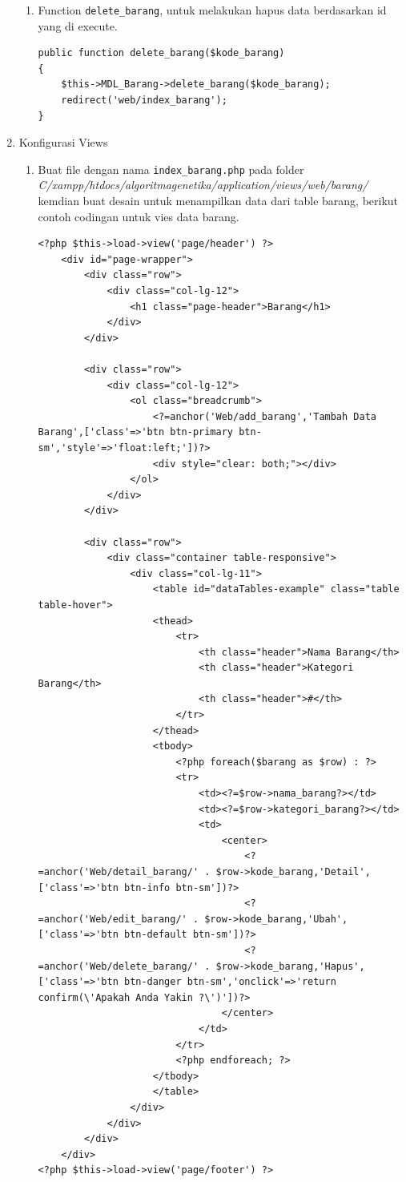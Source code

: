 \begin{enumerate}
\begin{enumerate}
    	\item Function \verb|delete_barang|, untuk melakukan hapus data berdasarkan id yang di execute.
\begin{lstlisting}
public function delete_barang($kode_barang)
{
	$this->MDL_Barang->delete_barang($kode_barang);
	redirect('web/index_barang');	
}
\end{lstlisting}
    \end{enumerate}
    
    \item Konfigurasi Views
    \begin{enumerate}
        \item Buat file dengan nama \verb|index_barang.php| pada folder \textit{C/xampp/htdocs/algoritmagenetika/application/views/web/barang/} kemdian buat desain untuk menampilkan data dari table barang, berikut contoh codingan untuk vies data barang.
\begin{lstlisting}
<?php $this->load->view('page/header') ?>
    <div id="page-wrapper">
        <div class="row">
            <div class="col-lg-12">
                <h1 class="page-header">Barang</h1>
            </div>
        </div>

        <div class="row">
            <div class="col-lg-12">
                <ol class="breadcrumb">
                    <?=anchor('Web/add_barang','Tambah Data Barang',['class'=>'btn btn-primary btn-sm','style'=>'float:left;'])?>
                    <div style="clear: both;"></div>
                </ol>
            </div>
        </div>

        <div class="row">
            <div class="container table-responsive">
                <div class="col-lg-11">
                    <table id="dataTables-example" class="table table-hover">
                    <thead>
                        <tr>
                            <th class="header">Nama Barang</th>
                            <th class="header">Kategori Barang</th>
                            <th class="header">#</th>
                        </tr>
                    </thead>
                    <tbody>
                        <?php foreach($barang as $row) : ?> 
                        <tr>
                            <td><?=$row->nama_barang?></td>
                            <td><?=$row->kategori_barang?></td>
                            <td>
                                <center>
                                    <?=anchor('Web/detail_barang/' . $row->kode_barang,'Detail',['class'=>'btn btn-info btn-sm'])?>
                                    <?=anchor('Web/edit_barang/' . $row->kode_barang,'Ubah',['class'=>'btn btn-default btn-sm'])?>
                                    <?=anchor('Web/delete_barang/' . $row->kode_barang,'Hapus',['class'=>'btn btn-danger btn-sm','onclick'=>'return confirm(\'Apakah Anda Yakin ?\')'])?>
                                </center>
                            </td>
                        </tr>
                        <?php endforeach; ?>
                    </tbody>
                    </table>
                </div>
            </div>
        </div>
    </div>
<?php $this->load->view('page/footer') ?>
\end{lstlisting}
    		

\end{enumerate}
\end{enumerate}
